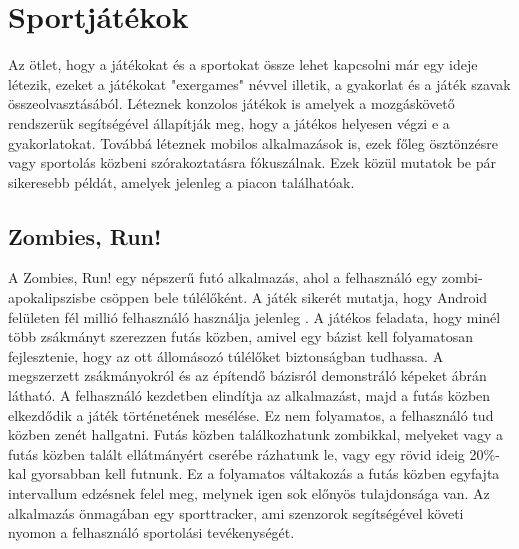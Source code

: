 \section{Sportjátékok}
\label{sportjatekok}

Az ötlet, hogy a játékokat és a sportokat össze lehet kapcsolni már egy ideje létezik, ezeket a játékokat "exergames" névvel illetik, a gyakorlat és a játék szavak összeolvasztásából. 
Léteznek konzolos játékok is amelyek a mozgáskövető rendszerük segítségével állapítják meg, hogy a játékos helyesen végzi e a gyakorlatokat. 
Továbbá léteznek mobilos alkalmazások is, ezek főleg ösztönzésre vagy sportolás közbeni szórakoztatásra fókuszálnak. 
Ezek közül mutatok be pár sikeresebb példát, amelyek jelenleg a piacon találhatóak. 

\subsection{Zombies, Run!}
\label{zombiesrun}
A Zombies, Run! egy népszerű futó alkalmazás, ahol a felhasználó egy zombi-apokalipszisbe csöppen bele túlélőként. 
A játék sikerét mutatja, hogy Android felületen fél millió felhasználó használja jelenleg \cite{zombiesrun}. 
A játékos feladata, hogy minél több zsákmányt szerezzen futás közben, amivel egy bázist kell folyamatosan fejlesztenie, hogy az ott állomásozó túlélőket biztonságban tudhassa. 
A megszerzett zsákmányokról és az építendő bázisról demonstráló képeket  ábrán látható. 
A felhasználó kezdetben elindítja az alkalmazást, majd a futás közben elkezdődik a játék történetének mesélése. 
Ez nem folyamatos, a felhasználó tud közben zenét hallgatni. 
Futás közben találkozhatunk zombikkal, melyeket vagy a futás közben talált ellátmányért cserébe rázhatunk le, vagy egy rövid ideig 20\%-kal gyorsabban kell futnunk. 
Ez a folyamatos váltakozás a futás közben egyfajta intervallum edzésnek felel meg, melynek igen sok előnyös tulajdonsága van. 
Az alkalmazás önmagában egy sporttracker, ami szenzorok segítségével követi nyomon a felhasználó sportolási tevékenységét.


